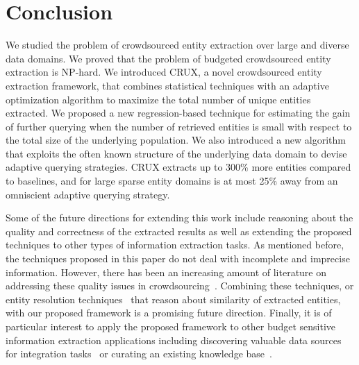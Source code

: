 
\section{Conclusion}
\label{sec:conclusions}

We studied the problem of crowdsourced entity extraction over large and diverse data domains. 
We proved that the problem of budgeted crowdsourced entity extraction is NP-hard. 
We introduced CRUX, a novel crowdsourced entity extraction framework, that combines statistical techniques with an adaptive optimization algorithm to maximize the total number of unique entities extracted. 
We proposed a new regression-based technique for estimating the gain of further querying when the number of retrieved entities is small with respect to the total size of the underlying population. We also introduced a new algorithm that exploits the often known structure of the underlying data domain to devise adaptive querying strategies. 
CRUX extracts up to 300\% more entities compared to baselines, and for large sparse entity domains is at most 25\% away from an omniscient adaptive querying strategy.


\iftr
Some of the future directions for extending this work include reasoning about the quality and correctness of the extracted results as well as extending the proposed techniques to other types of information extraction tasks. As mentioned before, the techniques proposed in this paper do not deal with incomplete and imprecise information. However, there has been an increasing amount of literature on addressing these quality issues in crowdsourcing~\cite{ vox-populii, quality, nushi:14, raykar-whom-to-trust}. Combining these techniques, or entity resolution techniques~\cite{crowder} that reason about similarity of extracted entities, with our proposed framework is a promising future direction. Finally, it is of particular interest to apply the proposed framework to other budget sensitive information extraction applications including discovering valuable data sources for integration tasks~\cite{rekatsinas:2015, rekatsinas:2014} or curating an existing knowledge base~\cite{kondredi:2014}.
\fi